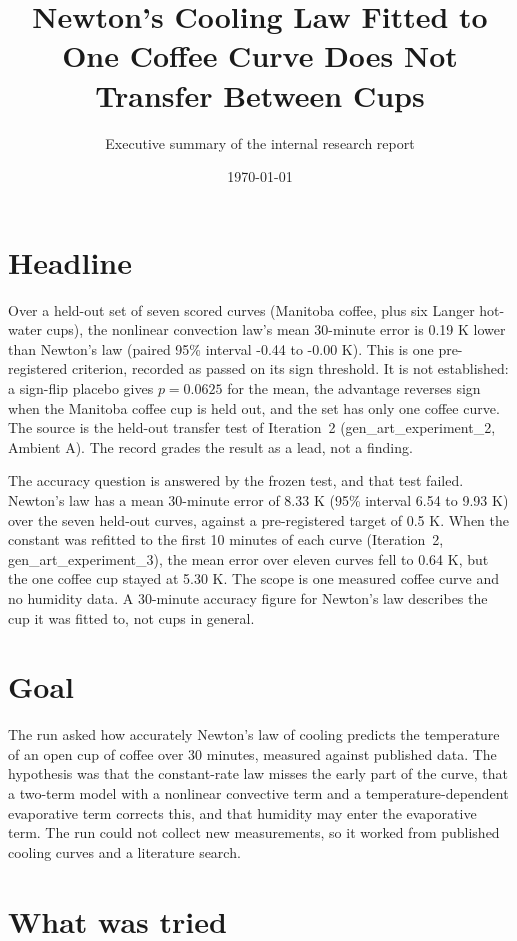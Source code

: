 \documentclass[11pt,letterpaper]{article}
\title{Newton's Cooling Law Fitted to One Coffee Curve Does Not Transfer Between Cups}
\author{Executive summary of the internal research report}
\date{\today}
\begin{document}
\maketitle

\section*{Headline}

Over a held-out set of seven scored curves (Manitoba coffee, plus six Langer hot-water cups), the nonlinear convection law's mean 30-minute error is 0.19 K lower than Newton's law (paired 95\% interval -0.44 to -0.00 K). This is one pre-registered criterion, recorded as passed on its sign threshold. It is not established: a sign-flip placebo gives $p = 0.0625$ for the mean, the advantage reverses sign when the Manitoba coffee cup is held out, and the set has only one coffee curve. The source is the held-out transfer test of Iteration~2 (gen\_art\_experiment\_2, Ambient A). The record grades the result as a lead, not a finding.

The accuracy question is answered by the frozen test, and that test failed. Newton's law has a mean 30-minute error of 8.33 K (95\% interval 6.54 to 9.93 K) over the seven held-out curves, against a pre-registered target of 0.5 K. When the constant was refitted to the first 10 minutes of each curve (Iteration~2, gen\_art\_experiment\_3), the mean error over eleven curves fell to 0.64 K, but the one coffee cup stayed at 5.30 K. The scope is one measured coffee curve and no humidity data. A 30-minute accuracy figure for Newton's law describes the cup it was fitted to, not cups in general.

\section*{Goal}

The run asked how accurately Newton's law of cooling predicts the temperature of an open cup of coffee over 30 minutes, measured against published data. The hypothesis was that the constant-rate law misses the early part of the curve, that a two-term model with a nonlinear convective term and a temperature-dependent evaporative term corrects this, and that humidity may enter the evaporative term. The run could not collect new measurements, so it worked from published cooling curves and a literature search.

\section*{What was tried}
\end{document}
